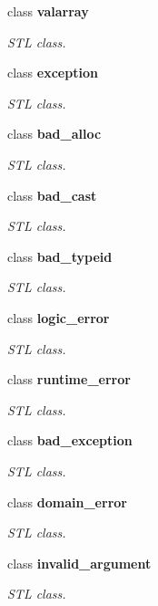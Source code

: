 \begin{DoxyCompactItemize}
class {\bfseries valarray}
\begin{DoxyCompactList}\small\item\em STL class. \end{DoxyCompactList}\item 
class {\bfseries exception}
\begin{DoxyCompactList}\small\item\em STL class. \end{DoxyCompactList}\item 
class {\bfseries bad\_\-alloc}
\begin{DoxyCompactList}\small\item\em STL class. \end{DoxyCompactList}\item 
class {\bfseries bad\_\-cast}
\begin{DoxyCompactList}\small\item\em STL class. \end{DoxyCompactList}\item 
class {\bfseries bad\_\-typeid}
\begin{DoxyCompactList}\small\item\em STL class. \end{DoxyCompactList}\item 
class {\bfseries logic\_\-error}
\begin{DoxyCompactList}\small\item\em STL class. \end{DoxyCompactList}\item 
class {\bfseries runtime\_\-error}
\begin{DoxyCompactList}\small\item\em STL class. \end{DoxyCompactList}\item 
class {\bfseries bad\_\-exception}
\begin{DoxyCompactList}\small\item\em STL class. \end{DoxyCompactList}\item 
class {\bfseries domain\_\-error}
\begin{DoxyCompactList}\small\item\em STL class. \end{DoxyCompactList}\item 
class {\bfseries invalid\_\-argument}
\begin{DoxyCompactList}\small\item\em STL class. \end{DoxyCompactList}\item 

\end{DoxyCompactItemize}
